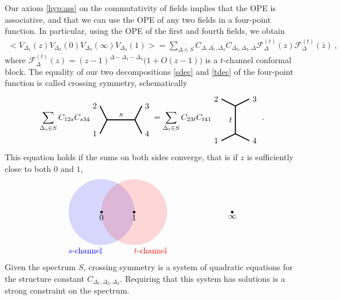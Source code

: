 \documentclass[12pt, a4paper]{article}
\theoremstyle{break}
\begin{document}
Our axiom \ref{hyp:ass} on the commutativity of fields implies that the OPE is associative, and that we can use the OPE of any two fields in a four-point function. In particular, using the OPE of the first and fourth fields, we obtain 
\begin{align}
 \Big<V_{\Delta_1}(z)V_{\Delta_2}(0)V_{\Delta_3}(\infty)V_{\Delta_4}(1)\Big>
 =\sum_{\Delta\in S} C_{\Delta,\Delta_1,\Delta_4} C_{\Delta_2,\Delta_3,\Delta}   \mathcal{F}^{(t)}_\Delta(z) \mathcal{F}^{(t)}_\Delta(\bar z)\ ,
 \label{tdec}
\end{align}
where $\mathcal{F}^{(t)}_\Delta(z) = (z-1)^{\Delta-\Delta_1-\Delta_4}\Big(1+O(z-1)\Big)$ is a $t$-channel conformal block.
The equality of our two decompositions \eqref{sdec} and \eqref{tdec} of the four-point function is called crossing symmetry, schematically 
\begin{align}
 \sum_{\Delta_s\in S} C_{12s} C_{s34} 
 \begin{tikzpicture}[baseline=(current  bounding  box.center), very thick, scale = .3]
\draw (-1,2) node [left] {$2$} -- (0,0) -- node [above] {$s$} (4,0) -- (5,2) node [right] {$3$};
\draw (-1,-2) node [left] {$1$} -- (0,0);
\draw (4,0) -- (5,-2) node [right] {$4$};
\end{tikzpicture} 
= \sum_{\Delta_t\in S} C_{23t}C_{t41} 
\begin{tikzpicture}[baseline=(current  bounding  box.center), very thick, scale = .3]
 \draw (-2,3) node [left] {$2$} -- (0,2) -- node [left] {$t$} (0,-2) -- (-2, -3) node [left] {$1$};
\draw (0,2) -- (2,3) node [right] {$3$};
\draw (0,-2) -- (2, -3) node [right] {$4$};
\end{tikzpicture}
\ .
\label{csd}
\end{align}
This equation holds if the sums on both sides converge, that is if $z$ is sufficiently close to both $0$ and $1$,
\begin{align}
\begin{tikzpicture}[scale = 1.4, baseline=(current  bounding  box.center)]
 \filldraw[blue, opacity = .15] (0, 0) circle [radius = 1];
 \filldraw[red, opacity = .15] (1, 0) circle [radius = 1];
 \filldraw (0, 0) circle [radius = 1pt] node [below] {$0$};
 \filldraw (1, 0) circle [radius = 1pt] node [below] {$1$};
 \filldraw (4, 0) circle [radius = 1pt] node [below] {$\infty$};
 \node[below, blue] at (-.5, -1) {$s$-channel};
 \node[below, red] at (1.5, -1) {$t$-channel};
\end{tikzpicture}
\end{align}
Given the spectrum $S$, crossing symmetry is a system of quadratic equations for the structure constant $C_{\Delta_1,\Delta_2,\Delta_3}$. Requiring that this system has solutions is a strong constraint on the spectrum. 
\end{document}
